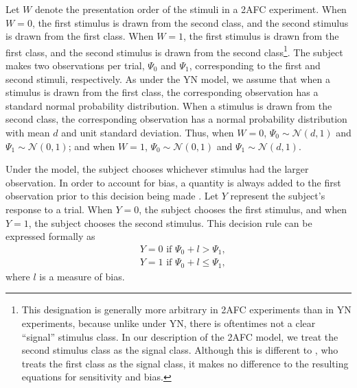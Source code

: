 \documentclass[man]{apa6}
\begin{document}
Let $W$ denote the presentation order of the stimuli in a 2AFC experiment. When $W=0$, the first stimulus is drawn from the second class, and the second stimulus is drawn from the first class. When $W=1$, the first stimulus is drawn from the first class, and the second stimulus is drawn from the second class\footnote{This designation is generally more arbitrary in 2AFC experiments than in YN experiments, because unlike under YN, there is oftentimes not a clear ``signal'' stimulus class. In our description of the 2AFC model, we treat the second stimulus class as the signal class. Although this is different to \textcite{decarloon2012}, who treats the first class as the signal class, it makes no difference to the resulting equations for sensitivity and bias.}. The subject makes two observations per trial, $\Psi_0$ and $\Psi_1$, corresponding to the first and second stimuli, respectively. As under the YN model, we assume that when a stimulus is drawn from the first class, the corresponding observation has a standard normal probability distribution. When a stimulus is drawn from the second class, the corresponding observation has a normal probability distribution with mean $d$ and unit standard deviation. Thus, when $W=0$, $\Psi_0\sim\mathcal{N}\left(d,1\right)$ and $\Psi_1\sim\mathcal{N}\left(0,1\right)$; and when $W=1$, $\Psi_0\sim\mathcal{N}\left(0,1\right)$ and $\Psi_1\sim\mathcal{N}\left(d,1\right)$.

Under the model, the subject chooses whichever stimulus had the larger observation. In order to account for bias, a quantity is always added to the first observation prior to this decision being made \parencite[see][]{decarloon2012}. Let $Y$ represent the subject's response to a trial. When $Y=0$, the subject chooses the first stimulus, and when $Y=1$, the subject chooses the second stimulus. This decision rule can be expressed formally as
\begin{eqnarray*}
&Y=0\textrm{ if }\Psi_0+l>\Psi_1\textrm{,}\\
&Y=1\textrm{ if }\Psi_0+l\le\Psi_1\textrm{,}
\end{eqnarray*}where $l$ is a measure of bias.
\end{document}
